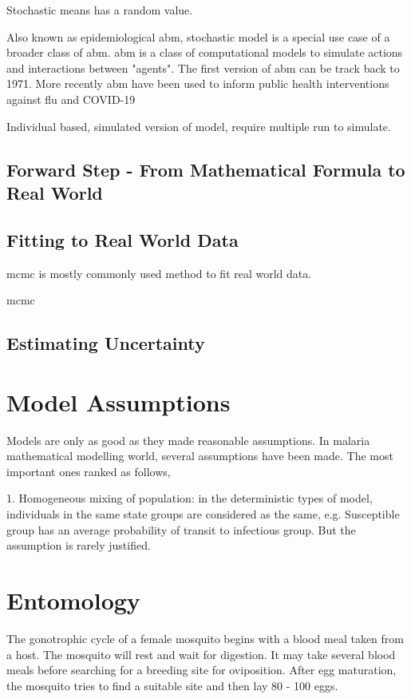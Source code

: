 \documentclass[a4paper, 12pt, twoside]{article}
\begin{document}
Stochastic means has a random value.

Also known as epidemiological \gls{abm}, stochastic model is a special use case of a broader class of \gls{abm}. \gls{abm} is a class of computational models to simulate actions and interactions between "agents". The first version of \gls{abm} can be track back to 1971\cite{Schelling1971}. More recently \gls{abm} have been used to inform public health interventions against flu\cite{Ferguson2006a, Ferguson2005} and COVID-19\cite{Maziarz2020, Ferguson2020, Chang2020}

Individual based, simulated version of model, require multiple run to simulate.

\subsection{Forward Step - From Mathematical Formula to Real World}

\subsection{Fitting to Real World Data}
\gls{mcmc} is mostly commonly used method to fit real world data.

\gls{mcmc}

\subsection{Estimating Uncertainty}

\section{Model Assumptions}
Models are only as good as they made reasonable assumptions. In malaria mathematical modelling world, several assumptions have been made. The most important ones ranked as follows,

1. Homogeneous mixing of population: in the deterministic types of model, individuals in the same state groups are considered as the same, e.g. Susceptible group has an average probability of transit to infectious group. But the assumption is rarely justified.



\section{Entomology}

The gonotrophic cycle of a female mosquito begins with a blood meal taken from a host. The mosquito will rest and wait for digestion. It may take several blood meals before searching for a breeding site for oviposition. After egg maturation, the mosquito tries to find a suitable site and then lay 80 - 100 eggs.
\end{document}
